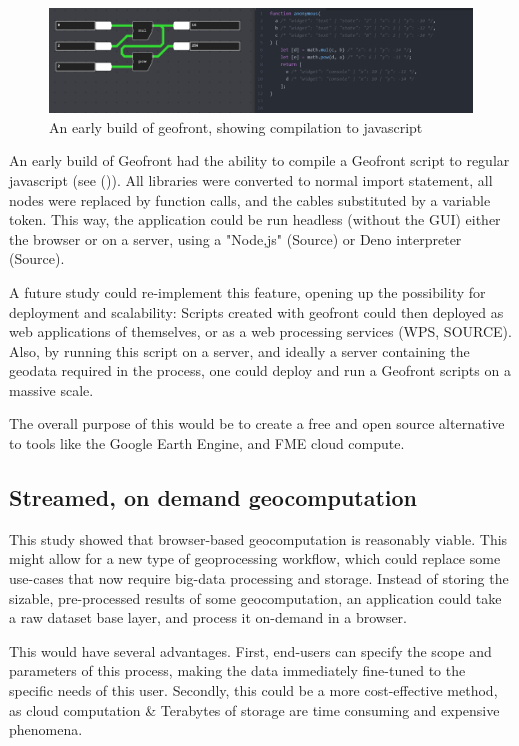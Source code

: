 \begin{figure}
  \centering
  \graphicspath{ {../../assets/images/implementation/} }
  \includegraphics[width=\linewidth]{early-geofront.png}
  \caption[Geofront to js]{An early build of geofront, showing compilation to javascript}
  \label{fig:early-geofront-compile-to-js}
\end{figure}

An early build of Geofront had the ability to compile a Geofront script to regular javascript (see ()).  
All libraries were converted to normal import statement, all nodes were replaced by function calls, and the cables substituted by a variable token. 
This way, the application could be run headless (without the \ac{GUI}) either the browser or on a server, using a "Node,js" (Source) or Deno interpreter (Source).

A future study could re-implement this feature, opening up the possibility for deployment and scalability: 
Scripts created with geofront could then deployed as web applications of themselves, or as a web processing services (WPS, SOURCE).
Also, by running this script on a server, and ideally a server containing the geodata required in the process, one could deploy and run a Geofront scripts on a massive scale. 

The overall purpose of this would be to create a free and open source alternative to tools like the Google Earth Engine, and FME cloud compute. 

\subsection{Streamed, on demand geocomputation}

This study showed that browser-based geocomputation is reasonably viable. 
This might allow for a new type of geoprocessing workflow, which could replace some use-cases that now require big-data processing and storage.
Instead of storing the sizable, pre-processed results of some geocomputation, an application could take a raw dataset base layer, and process it on-demand in a browser.

This would have several advantages. 
First, end-users can specify the scope and parameters of this process, making the data immediately fine-tuned to the specific needs of this user. 
Secondly, this could be a more cost-effective method, as cloud computation \& Terabytes of storage are time consuming and expensive phenomena.

